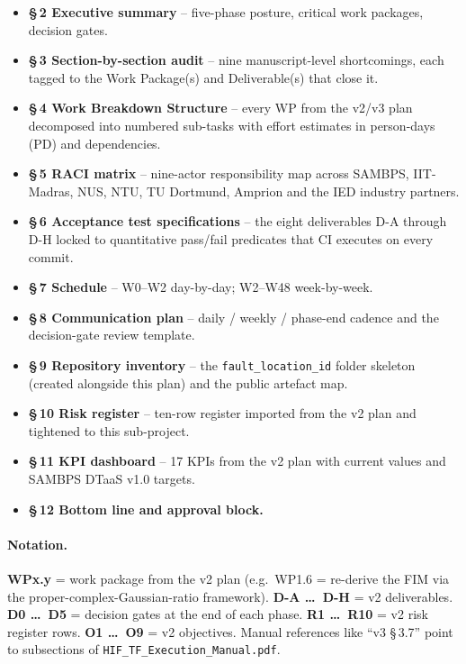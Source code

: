 \documentclass[11pt,a4paper]{article}
\begin{document}
\begin{itemize}
  \item \textbf{\S\,2 Executive summary} -- five-phase posture, critical work
    packages, decision gates.
  \item \textbf{\S\,3 Section-by-section audit} -- nine manuscript-level
    shortcomings, each tagged to the Work Package(s) and Deliverable(s)
    that close it.
  \item \textbf{\S\,4 Work Breakdown Structure} -- every WP from the v2/v3
    plan decomposed into numbered sub-tasks with effort estimates in
    person-days (PD) and dependencies.
  \item \textbf{\S\,5 RACI matrix} -- nine-actor responsibility map across
    SAMBPS, IIT-Madras, NUS, NTU, TU Dortmund, Amprion and the IED
    industry partners.
  \item \textbf{\S\,6 Acceptance test specifications} -- the eight
    deliverables D-A through D-H locked to quantitative pass/fail
    predicates that CI executes on every commit.
  \item \textbf{\S\,7 Schedule} -- W0--W2 day-by-day; W2--W48 week-by-week.
  \item \textbf{\S\,8 Communication plan} -- daily / weekly / phase-end
    cadence and the decision-gate review template.
  \item \textbf{\S\,9 Repository inventory} -- the
    \texttt{fault\_location\_id} folder skeleton (created alongside this
    plan) and the public artefact map.
  \item \textbf{\S\,10 Risk register} -- ten-row register imported from the
    v2 plan and tightened to this sub-project.
  \item \textbf{\S\,11 KPI dashboard} -- 17 KPIs from the v2 plan with
    current values and SAMBPS DTaaS v1.0 targets.
  \item \textbf{\S\,12 Bottom line and approval block.}
\end{itemize}

\paragraph{Notation.}
\textbf{WPx.y} = work package from the v2 plan
(e.g.\ WP1.6 = re-derive the FIM via the proper-complex-Gaussian-ratio
framework).  \textbf{D-A \ldots\ D-H} = v2 deliverables.
\textbf{D0 \ldots\ D5} = decision gates at the end of each phase.
\textbf{R1 \ldots\ R10} = v2 risk register rows.  \textbf{O1 \ldots\ O9} =
v2 objectives.  Manual references like ``v3 \S\,3.7'' point to subsections
of \texttt{HIF\_TF\_Execution\_Manual.pdf}.
\end{document}
